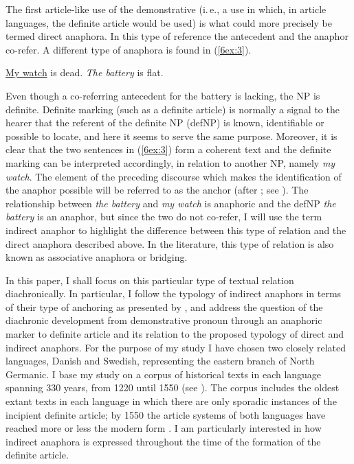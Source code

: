 \documentclass[output=paper]{langsci/langscibook}
\begin{document}
The first article-like use of the demonstrative (i.\,e., a use in which, in article languages, the definite article would be used) is what could more precisely be termed direct anaphora. In this type of reference the antecedent and the anaphor co-refer. A different type of anaphora is found in (\ref{6ex:3}).

\begin{exe}
\ex\label{6ex:3}
{\ul{My watch}} is dead. {\emph{The battery}} is flat. \citep[after][]{schwarz:00}
\end{exe}

Even though a co-referring antecedent for the battery is lacking, the NP is definite. Definite marking (such as a definite article) is normally a signal to the hearer that the referent of the definite NP (defNP) is known, identifiable or possible to locate, and here it seems to serve the same purpose. Moreover, it is clear that the two sentences in (\ref{6ex:3}) form a coherent text and the definite marking can be interpreted accordingly, in relation to another NP, namely {\emph{my watch}}. The element of the preceding discourse which makes the identification of the anaphor possible will be referred to as the anchor (after \citealt{fraurud:90}; see ). The relationship between {\emph{the battery}} and {\emph{my watch}} is anaphoric and the defNP {\emph{the battery}} is an anaphor, but since the two do not co-refer, I will use the term indirect anaphor to highlight the difference between this type of relation and the direct anaphora described above. In the literature, this type of relation is also known as associative anaphora or bridging.

\largerpage[-1]
In this paper, I shall focus on this particular type of textual relation diachronically. In particular, I follow the typology of indirect anaphors in terms of their type of anchoring as presented by \cite{schwarz:00}, and address the question of the diachronic development from demonstrative pronoun through an anaphoric marker to definite article and its relation to the proposed typology of direct and indirect anaphors. For the purpose of my study I have chosen two closely related languages, Danish and Swedish, representing the eastern branch of North Germanic. I base my study on a corpus of historical texts in each language spanning 330 years, from 1220 until 1550 (see ). The corpus includes the oldest extant texts in each language in which there are only sporadic instances of the incipient definite article; by 1550 the article systems of both languages have reached more or less the modern form \citep{strohwollin:16,skaftejensen:07}. I am particularly interested in how indirect anaphora is expressed throughout the time of the formation of the definite article.
\end{document}
